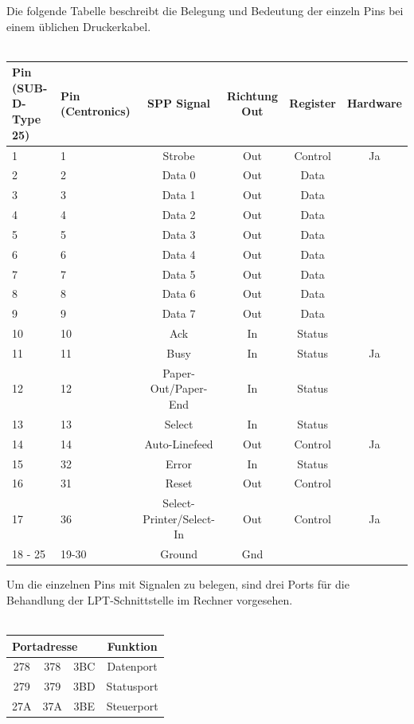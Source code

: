 \documentclass[a4paper,11pt]{article}
\begin{document}
 
 Die folgende Tabelle beschreibt die  Belegung und Bedeutung der einzeln Pins bei einem üblichen Druckerkabel. 
 \\ \\
 \begin{tabular}{|p{20mm}|p{20mm}|c|c|c|c|}
  \hline
	Pin (SUB-D-Type 25) & Pin (Centronics) & SPP Signal & Richtung Out & Register & Hardware\\ \hline
	1 & 	1	& 	Strobe				& 	Out		&	Control		&	Ja	\\ \hline
	2 & 	2	&	Data 0				&	Out		& 	Data		&     \\ \hline
	3 &	3	&	Data 1				&	Out		&	Data		&     \\ \hline
	4 &	4	&	Data 2				&	Out		&	Data		&     \\ \hline
	5 &	5	&	Data 3				&	Out		&	Data		&     \\ \hline
	6 &	6	&	Data 4				&	Out		&	Data		&     \\ \hline
	7 &	7	&	Data 5				&	Out		&	Data		&     \\ \hline
	8 &	8	&	Data 6				&	Out		&	Data		&     \\ \hline
	9 &	9	&	Data 7				&	Out		&	Data		&     \\ \hline
	10 & 	10	&	Ack				&	In		&	Status		&	    \\ \hline
	11 & 	11	&	Busy				&	In		&	Status		&	Ja  \\ \hline
	12 & 	12	&	Paper-Out/Paper-End		&	In		&	Status		&	    \\ \hline
	13 & 	13	&	Select				&	In		&	Status		&	    \\ \hline
	14 & 	14	&	Auto-Linefeed			&	Out		&	Control		&	Ja  \\ \hline
	15 & 	32	&	Error				&	In		&	Status		&	    \\ \hline
	16 & 	31	&	Reset				&	Out		&	Control		&	    \\ \hline
	17 & 	36	&	Select-Printer/Select-In	&	Out		&	Control		&	Ja  \\ \hline
	18 - 25	&	19-30	&	Ground	&	Gnd	&	&             \\ \hline
 \end{tabular}


Um die einzelnen Pins mit Signalen zu belegen, sind drei Ports für die Behandlung der LPT-Schnittstelle im Rechner vorgesehen.  \\\\
 \begin{tabular}{|c|c|c|c|}
 \hline
\multicolumn{3}{|l|}{Portadresse}	&	Funktion\\  \hline 
278	&	378	&	3BC	&	Datenport \\  \hline 
279	&	379	&	3BD	&	Statusport \\  \hline 
27A	&	37A	&	3BE	&	Steuerport \\  \hline 
 \end{tabular} 
 
\end{document}
